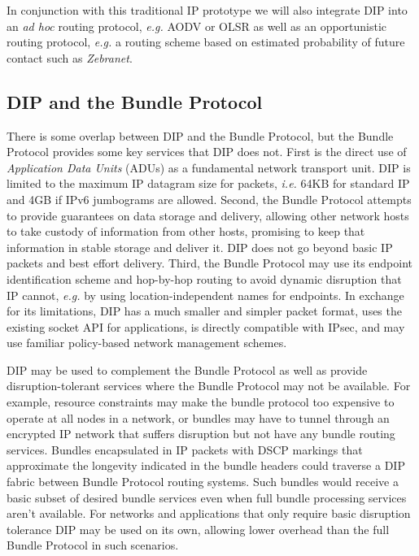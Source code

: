 \documentclass[10pt,letterpaper]{article}
\begin{document}
In conjunction with this traditional IP prototype we will
also integrate DIP into an {\em ad hoc} routing protocol, {\em e.g.}
AODV\cite{aodv:rfc} or OLSR\cite{olsr:rfc} as well as an opportunistic
routing protocol, {\em e.g.} a routing scheme based on estimated
probability of future contact such as {\em Zebranet}\cite{zebranet}.


\subsection{DIP and the Bundle Protocol}
There is some overlap between DIP and the Bundle Protocol,
but the Bundle Protocol provides some key services that
DIP does not. First is the direct use of
{\em Application Data Units} (ADUs)\cite{alf} as a fundamental
network transport unit. DIP is limited to the maximum IP datagram
size for packets, {\em i.e.} 64KB for standard IP and 4GB if IPv6
jumbograms are allowed. Second, the Bundle Protocol attempts to
provide guarantees on data storage and delivery, allowing 
other network hosts to take custody of information from other
hosts, promising to keep that information in stable storage
and deliver it. DIP does not go beyond basic IP
packets and best effort delivery. Third, the Bundle Protocol
may use its endpoint identification scheme and hop-by-hop
routing to avoid dynamic disruption that IP cannot, {\em e.g.}
by using location-independent names for endpoints.
In exchange for its limitations, DIP has a much smaller and
simpler packet format, uses the existing socket API for
applications, is directly compatible with IPsec,
and may use familiar policy-based network management schemes.

DIP may be used to complement the Bundle Protocol as well as provide
disruption-tolerant services where the Bundle Protocol may not be available.
For example, resource constraints may make the bundle protocol too
expensive to operate at all nodes in a network, or bundles may have
to tunnel through an encrypted IP network that suffers disruption
but not have any bundle routing services. Bundles encapsulated in IP
packets with DSCP markings that approximate the longevity indicated in
the bundle headers could traverse a DIP fabric between Bundle Protocol
routing systems. Such bundles would receive a basic subset of desired
bundle services even when full bundle processing services aren't available.
For networks and applications that only require basic disruption tolerance
DIP may be used on its own, allowing lower overhead than the full
Bundle Protocol in such scenarios.
\end{document}
